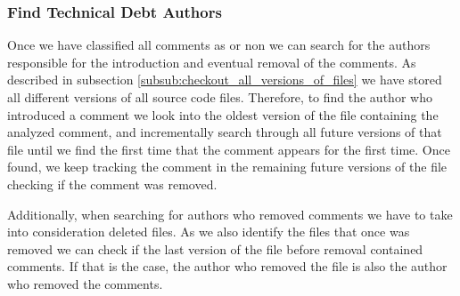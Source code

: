 \subsubsection*{Find Technical Debt Authors}
\label{subsub:find_technical_debt_authors}

Once we have classified all comments as \SATD or non \SATD we can search for the authors responsible for the introduction and eventual removal of the \SATD comments. As described in subsection \ref{subsub:checkout_all_versions_of_files} we have stored all different versions of all source code files. Therefore, to find the author who introduced a \SATD comment we look into the oldest version of the file containing the analyzed comment, and incrementally search through all future versions of that file until we find the first time that the comment appears for the first time. Once found, we keep tracking the \SATD comment in the remaining future versions of the file checking if  the \SATD comment was removed. 

Additionally, when searching for authors who removed \SATD comments we have to take into consideration deleted files. As we also identify the files that once was removed we can check if the last version of the file before removal contained \SATD comments. If that is the case, the author who removed the file is also the author who removed the \SATD comments. 